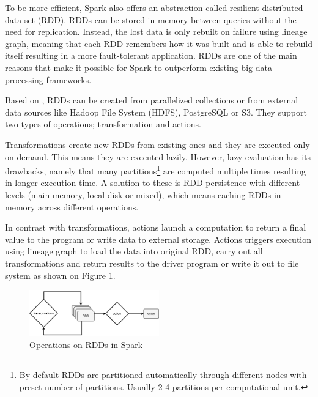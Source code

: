 To be more efficient, Spark also offers an abstraction called resilient distributed data set (RDD). RDDs can be stored in memory between queries without the need for replication. Instead, the lost data is only rebuilt on failure using lineage graph, meaning that each RDD remembers how it was built and is able to rebuild itself resulting in a more fault-tolerant application. RDDs are one of the main reasons that make it possible for Spark to outperform existing big data processing frameworks. \cite{spark}

Based on \cite{spark:rdds}, RDDs can be created from parallelized collections or from external data sources like Hadoop File System (HDFS), PostgreSQL or S3. They support two types of operations; transformation and actions.

Transformations create new RDDs from existing ones and they are executed only on demand. This means they are executed lazily. However, lazy evaluation has its drawbacks, namely that many partitions\footnote{By default RDDs are partitioned automatically  through different nodes with preset number of partitions. Usually 2-4 partitions per computational unit.} are computed multiple times resulting in longer execution time. A solution to these is RDD persistence with different levels (main memory, local disk or mixed), which means caching RDDs in memory across different operations. 
 
In contrast with transformations, actions launch a computation to return a final value to the program or write data to external storage. Actions triggers execution using lineage graph to load the data into original RDD, carry out all transformations and return  results to the driver program or write it out to file system as shown on Figure \ref{fig:spark-ops}.

\begin{figure}[h]
    \centering
    \includegraphics[width=0.5\textwidth]{images/operations_spark.png}
    \caption{Operations on RDDs in Spark}
    \label{fig:spark-ops}
\end{figure}

